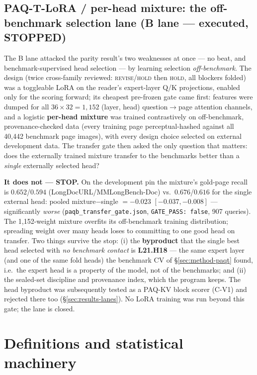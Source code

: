 \documentclass[11pt,letterpaper]{article}
\newcommand{\paqt}{\textsc{PAQ-T}}
\newcommand{\paqc}{\textsc{PAQ-KV}}
\begin{document}
\subsection{\paqt{}-LoRA / per-head mixture: the off-benchmark selection lane (B lane --- executed, STOPPED)}\label{sec:method-lora}
The B lane attacked the parity result's two weaknesses at once --- no beat, and
benchmark-supervised head selection --- by learning selection \emph{off-benchmark}. The design
(twice cross-family reviewed: \textsc{revise/hold} then \textsc{hold}, all blockers folded) was
a toggleable LoRA on the reader's expert-layer Q/K projections, enabled only for the scoring
forward; its cheapest pre-frozen gate came first: features were dumped for all
$36\times32=1{,}152$ (layer, head) question$\to$page attention channels, and a logistic
\textbf{per-head mixture} was trained contrastively on off-benchmark, provenance-checked data
(every training page perceptual-hashed against all 40{,}442 benchmark page images), with every
design choice selected on external development data. The transfer gate then asked the only
question that matters: does the externally trained mixture transfer to the benchmarks better
than a \emph{single} externally selected head?

\textbf{It does not --- STOP.} On the development pin the mixture's gold-page recall is
$0.652$/$0.594$ (LongDocURL/MMLongBench-Doc) vs.\ $0.676$/$0.616$ for the single external
head: pooled mixture$-$single $= -0.023$ $[-0.037, -0.008]$ --- significantly \emph{worse}
(\texttt{paqb\_transfer\_gate.json}, \texttt{GATE\_PASS: false}, 907 queries). The
1{,}152-weight mixture overfits its off-benchmark training distribution; spreading weight over
many heads loses to committing to one good head on transfer. Two things survive the stop:
(i) the \textbf{byproduct} that the single best head selected with \emph{no benchmark contact}
is \textbf{L21.H18} --- the same expert layer (and one of the same fold heads) the benchmark CV
of \S\ref{sec:method-paqt} found, i.e.\ the expert head is a property of the model, not of the
benchmarks; and (ii) the sealed-set discipline and provenance index, which the program keeps.
The head byproduct was subsequently tested as a \paqc{} block scorer (C-V1) and rejected there
too (\S\ref{sec:results-lanes}). No LoRA training was run beyond this gate; the lane is
closed.

\section{Definitions and statistical machinery}\label{sec:maths}
\end{document}

